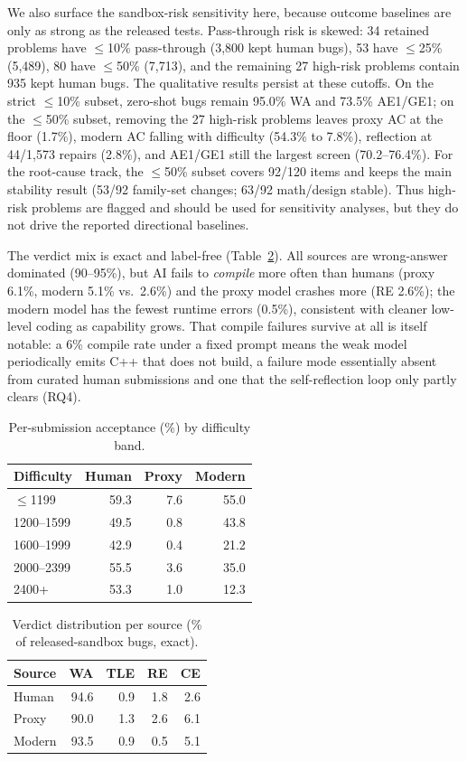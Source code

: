 \documentclass[conference]{IEEEtran}
\begin{document}
We also surface the sandbox-risk sensitivity here, because outcome baselines are only
as strong as the released tests. Pass-through risk is skewed: 34 retained problems
have $\le$10\% pass-through (3{,}800 kept human bugs), 53 have $\le$25\% (5{,}489),
80 have $\le$50\% (7{,}713), and the remaining 27 high-risk problems contain 935
kept human bugs. The qualitative results persist at these cutoffs. On the strict
$\le$10\% subset, zero-shot bugs remain 95.0\% WA and 73.5\% AE1/GE1; on the
$\le$50\% subset, removing the 27 high-risk problems leaves proxy AC at the floor
(1.7\%), modern AC falling with difficulty (54.3\% to 7.8\%), reflection at
44/1{,}573 repairs (2.8\%), and AE1/GE1 still the largest screen (70.2--76.4\%).
For the root-cause track, the $\le$50\% subset covers 92/120 items and keeps the
main stability result (53/92 family-set changes; 63/92 math/design stable). Thus
high-risk problems are flagged and should be used for sensitivity analyses, but they
do not drive the reported directional baselines.

The verdict mix is exact and label-free (Table~\ref{tab:verdict}). All sources are
wrong-answer dominated (90--95\%), but AI fails to \emph{compile} more often than
humans (proxy 6.1\%, modern 5.1\% vs.\ 2.6\%) and the proxy model crashes more
(RE 2.6\%); the modern model has the fewest runtime errors (0.5\%), consistent with
cleaner low-level coding as capability grows. That compile failures survive at all is
itself notable: a 6\% compile rate under a fixed prompt means the weak model
periodically emits C++ that does not build, a failure mode essentially absent from
curated human submissions and one that the self-reflection loop only partly clears
(RQ4).

\begin{table}[t]
\centering
\caption{Per-submission acceptance (\%) by difficulty band.}
\label{tab:acdiff}
\begin{tabular}{lrrr}
\toprule
Difficulty & Human & Proxy & Modern\\
\midrule
$\le$1199 & 59.3 & 7.6 & 55.0\\
1200--1599 & 49.5 & 0.8 & 43.8\\
1600--1999 & 42.9 & 0.4 & 21.2\\
2000--2399 & 55.5 & 3.6 & 35.0\\
2400+ & 53.3 & 1.0 & 12.3\\
\bottomrule
\end{tabular}
\end{table}

\begin{table}[t]
\centering
\caption{Verdict distribution per source (\% of released-sandbox bugs, exact).}
\label{tab:verdict}
\begin{tabular}{lrrrr}
\toprule
Source & WA & TLE & RE & CE\\
\midrule
Human & 94.6 & 0.9 & 1.8 & 2.6\\
Proxy & 90.0 & 1.3 & 2.6 & 6.1\\
Modern & 93.5 & 0.9 & 0.5 & 5.1\\
\bottomrule
\end{tabular}
\end{table}
\end{document}
